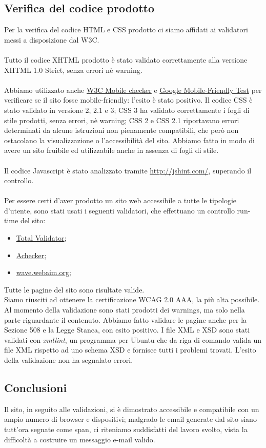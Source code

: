 {	\subsection{Verifica del codice prodotto}{
		Per la verifica del codice HTML e CSS prodotto ci siamo affidati ai validatori messi a disposizione dal W3C.\\
		\\
		Tutto il codice XHTML prodotto è stato validato correttamente alla versione XHTML 1.0 Strict, senza errori nè warning.\\
		\\
		Abbiamo utilizzato anche \href{https://validator.w3.org/mobile-alpha/}{W3C Mobile checker} e \href{https://www.google.com/webmasters/tools/mobile-friendly/}{Google Mobile-Friendly Test} per verificare se il sito fosse mobile-friendly: l'esito è stato positivo.
		Il codice CSS è stato validato in versione 2, 2.1 e 3; CSS 3 ha validato correttamente i fogli di stile prodotti, senza errori, nè warning; CSS 2 e CSS 2.1 riportavano errori determinati da alcune istruzioni non pienamente compatibili, che però non ostacolano la visualizzazione o l'accessibilità del sito. Abbiamo fatto in modo di avere un sito fruibile ed utilizzabile anche in assenza di fogli di stile.\\
		\\
		Il codice Javascript è stato analizzato tramite \url{http://jshint.com/}, superando il controllo.\\
		\\
		Per essere certi d'aver prodotto un sito web accessibile a tutte le tipologie d'utente, sono stati usati i seguenti validatori, che effettuano un controllo run-time del sito:
		\begin{itemize}\itemsep1pt
			\item \href{https://www.totalvalidator.com/}{Total Validator};
			\item \href{http://achecker.ca/checker/index.php}{Achecker};
			\item \href{http://wave.webaim.org/}{wave.webaim.org};
		\end{itemize}
		Tutte le pagine del sito sono risultate valide.\\
		Siamo riusciti ad ottenere la certificazione WCAG 2.0 AAA, la più alta possibile. Al momento della validazione sono stati prodotti dei warnings, ma solo nella parte riguardante il contenuto. Abbiamo fatto validare le pagine anche per la Sezione 508 e la Legge Stanca, con esito positivo.
		I file XML e XSD sono stati validati con \textit{xmllint}, un programma per Ubuntu che da riga di comando valida un file XML rispetto ad uno schema XSD e fornisce tutti i problemi trovati. L'esito della validazione non ha segnalato errori.
	}
	
	
	\subsection{Conclusioni}
		Il sito, in seguito alle validazioni, si è dimostrato accessibile e compatibile con un ampio numero di browser e dispositivi; malgrado le email generate dal sito siano tutt'ora segnate come span, ci riteniamo suddisfatti del lavoro svolto, vista la difficoltà a costruire un messaggio e-mail valido.
}